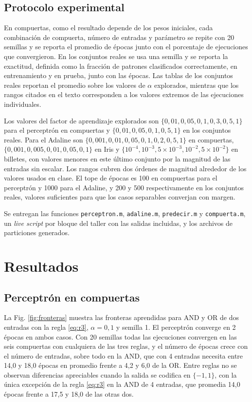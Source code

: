 \documentclass[conference]{IEEEtran}
\begin{document}
\subsection{Protocolo experimental}

En compuertas, como el resultado depende de los pesos iniciales, cada combinaci\'on de compuerta, n\'umero de entradas y par\'ametro se repite con 20 semillas y se reporta el promedio de \'epocas junto con el porcentaje de ejecuciones que convergieron. En los conjuntos reales se usa una semilla y se reporta la exactitud, definida como la fracci\'on de patrones clasificados correctamente, en entrenamiento y en prueba, junto con las \'epocas. Las tablas de los conjuntos reales reportan el promedio sobre los valores de $\alpha$ explorados, mientras que los rangos citados en el texto corresponden a los valores extremos de las ejecuciones individuales.

Los valores del factor de aprendizaje explorados son $\{0{,}01, 0{,}05, 0{,}1, 0{,}3, 0{,}5, 1\}$ para el perceptr\'on en compuertas y $\{0{,}01, 0{,}05, 0{,}1, 0{,}5, 1\}$ en los conjuntos reales. Para el Adaline son $\{0{,}001, 0{,}01, 0{,}05, 0{,}1, 0{,}2, 0{,}5, 1\}$ en compuertas, $\{0{,}001, 0{,}005, 0{,}01, 0{,}05, 0{,}1\}$ en Iris y $\{10^{-4}, 10^{-3}, 5 \times 10^{-3}, 10^{-2}, 5 \times 10^{-2}\}$ en billetes, con valores menores en este \'ultimo conjunto por la magnitud de las entradas sin escalar. Los rangos cubren dos \'ordenes de magnitud alrededor de los valores usados en clase. El tope de \'epocas es 100 en compuertas para el perceptr\'on y 1000 para el Adaline, y 200 y 500 respectivamente en los conjuntos reales, valores suficientes para que los casos separables converjan con margen.

Se entregan las funciones \texttt{perceptron.m}, \texttt{adaline.m}, \texttt{predecir.m} y \texttt{compuerta.m}, un \textit{live script} por bloque del taller con las salidas incluidas, y los archivos de particiones generados.

\section{Resultados}
\label{sec:resultados}

\subsection{Perceptr\'on en compuertas}

La Fig. \ref{fig:fronteras} muestra las fronteras aprendidas para AND y OR de dos entradas con la regla \eqref{eq:r3}, $\alpha = 0{,}1$ y semilla 1. El perceptr\'on converge en 2 \'epocas en ambos casos. Con 20 semillas todas las ejecuciones convergen en las seis compuertas con cualquiera de las tres reglas, y el n\'umero de \'epocas crece con el n\'umero de entradas, sobre todo en la AND, que con 4 entradas necesita entre 14,0 y 18,0 \'epocas en promedio frente a 4,2 y 6,0 de la OR. Entre reglas no se observan diferencias apreciables cuando la salida se codifica en $\{-1,1\}$, con la \'unica excepci\'on de la regla \eqref{eq:r3} en la AND de 4 entradas, que promedia 14,0 \'epocas frente a 17,5 y 18,0 de las otras dos.
\end{document}
